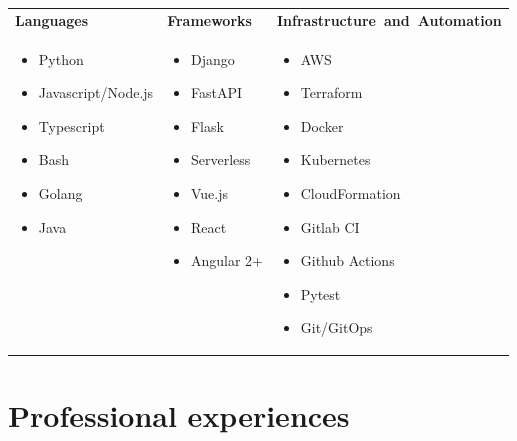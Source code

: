 \documentclass[letterpaper]{twentysecondcv} %
\begin{document}
\begin{tabular}{ p{4cm} p{4cm} p{5cm}}
    \textbf{Languages} & \textbf{Frameworks} & \textbf{Infrastructure~and~Automation} \\
    
    \begin{itemize}
      \item Python
      \item Javascript/Node.js
      \item Typescript 
      \item Bash 
      \item Golang
      \item Java
    \end{itemize} &
    \begin{itemize}
      \item Django
      \item FastAPI
      \item Flask
      \item Serverless
      \item Vue.js 
      \item React 
      \item Angular 2+ 
    \end{itemize} &
    \begin{itemize}
      \item AWS
      \item Terraform
      \item Docker
      \item Kubernetes
      \item CloudFormation
      \item Gitlab CI
      \item Github Actions
      \item Pytest
      \item Git/GitOps
    \end{itemize} \\
\end{tabular}

\vspace{-0.5cm}


\section{Professional experiences}
\vspace{0.20cm}
\end{document}
